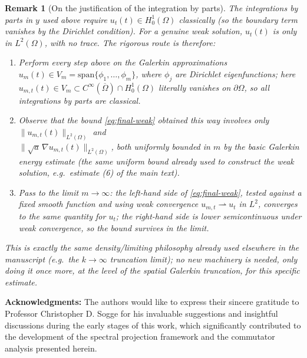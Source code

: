 \documentclass[11pt,letterpaper]{amsart}
\newtheorem{remark}[theorem]{Remark}
\newcommand{\Om}{\Omega}
\begin{document}
\begin{remark}[On the justification of the integration by parts]
The integrations by parts in $y$ used above require $u_t(t)\in H^1_0(\Om)$ classically (so the boundary term vanishes by the Dirichlet condition). For a genuine weak solution, $u_t(t)$ is only in $L^2(\Om)$, with no trace. The rigorous route is therefore:
\begin{enumerate}
\item[(i)] Perform every step above on the Galerkin approximations $u_m(t)\in V_m=\mathrm{span}\{\phi_1,\dots,\phi_m\}$, where $\phi_j$ are Dirichlet eigenfunctions; here $u_{m,t}(t)\in V_m\subset C^\infty(\overline\Om)\cap H^1_0(\Om)$ literally vanishes on $\partial\Om$, so all integrations by parts are classical.
\item[(ii)] Observe that the bound \eqref{eq:final-weak} obtained this way involves only $\|u_{m,t}(t)\|_{L^2(\Om)}$ and \\$\|\sqrt a\,\nabla u_{m,t}(t)\|_{L^2(\Om)}$, both \emph{uniformly bounded in $m$} by the basic Galerkin energy estimate (the same uniform bound already used to construct the weak solution, e.g.\ estimate (6) of the main text).
\item[(iii)] Pass to the limit $m\to\infty$: the left-hand side of \eqref{eq:final-weak}, tested against a fixed smooth function and using weak convergence $u_{m,t}\rightharpoonup u_t$ in $L^2$, converges to the same quantity for $u_t$; the right-hand side is lower semicontinuous under weak convergence, so the bound survives in the limit.
\end{enumerate}
This is exactly the same density/limiting philosophy already used elsewhere in the manuscript (e.g.\ the $k\to\infty$ truncation limit); no new machinery is needed, only doing it once more, at the level of the spatial Galerkin truncation, for this specific estimate.
\end{remark}


{\bf Acknowledgments:} The authors would like to express their sincere gratitude to Professor Christopher D. Sogge for his invaluable suggestions and insightful discussions during the early stages of this work, which significantly contributed to the development of the spectral projection framework and the commutator analysis presented herein.
\end{document}
